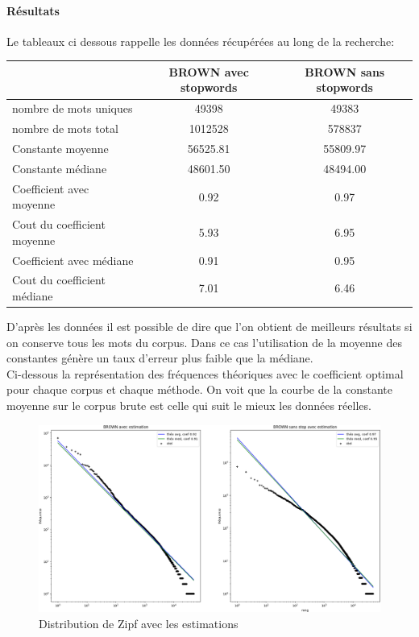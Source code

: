 \documentclass[a4paper,12pt]{article}
\begin{document}
	\paragraph{Résultats}
		
		Le tableaux ci dessous rappelle les données récupérées au long de la recherche:
		\begin{center}
			\begin{tabular}{|l|c|c|}
				\hline
				& BROWN avec stopwords & BROWN sans stopwords \\
				\hline
				nombre de mots uniques & 49398 & 49383 \\
				\hline
				nombre de mots total & 1012528 & 578837 \\
				\hline
				Constante moyenne & 56525.81 & 55809.97 \\
				\hline
				Constante médiane & 48601.50 & 48494.00 \\
				\hline
				Coefficient avec moyenne & 0.92 & 0.97 \\
				\hline
				Cout du coefficient moyenne & 5.93 & 6.95 \\
				\hline
				Coefficient avec médiane & 0.91 & 0.95 \\
				\hline
				Cout du coefficient médiane & 7.01  & 6.46 \\
				\hline
			\end{tabular}		
		\end{center}
		
		D'après les données il est possible de dire que l'on obtient de meilleurs résultats si on conserve tous les mots du corpus. Dans ce cas l'utilisation de la moyenne des constantes génère un taux d'erreur plus faible que la médiane.\\
		
		Ci-dessous la représentation des fréquences théoriques avec le coefficient optimal pour chaque corpus et chaque méthode. On voit que la courbe de la constante moyenne sur le corpus brute est celle qui suit le mieux les données réelles.
		\begin{figure}[H]
			\includegraphics[width=\linewidth]{img/zipfFin.png}
			\caption{Distribution de Zipf avec les estimations}
		\end{figure}
		
\end{document}

